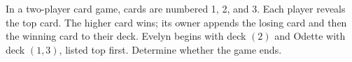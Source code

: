 In a two-player card game, cards are numbered 1, 2, and 3. Each player reveals the top card. The higher card wins; its owner appends the losing card and then the winning card to their deck. Evelyn begins with deck $(2)$ and Odette with deck $(1,3)$, listed top first. Determine whether the game ends.
